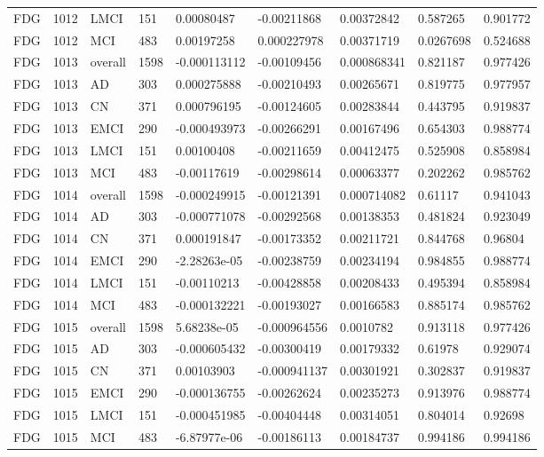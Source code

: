 \begin{landscape}
\begin{longtable}{lllllllll}
FDG & 1012 & LMCI & 151 & 0.00080487 & -0.00211868 & 0.00372842 & 0.587265 & 0.901772 \\
FDG & 1012 & MCI & 483 & 0.00197258 & 0.000227978 & 0.00371719 & 0.0267698 & 0.524688 \\
FDG & 1013 & overall & 1598 & -0.000113112 & -0.00109456 & 0.000868341 & 0.821187 & 0.977426 \\
FDG & 1013 & AD & 303 & 0.000275888 & -0.00210493 & 0.00265671 & 0.819775 & 0.977957 \\
FDG & 1013 & CN & 371 & 0.000796195 & -0.00124605 & 0.00283844 & 0.443795 & 0.919837 \\
FDG & 1013 & EMCI & 290 & -0.000493973 & -0.00266291 & 0.00167496 & 0.654303 & 0.988774 \\
FDG & 1013 & LMCI & 151 & 0.00100408 & -0.00211659 & 0.00412475 & 0.525908 & 0.858984 \\
FDG & 1013 & MCI & 483 & -0.00117619 & -0.00298614 & 0.00063377 & 0.202262 & 0.985762 \\
FDG & 1014 & overall & 1598 & -0.000249915 & -0.00121391 & 0.000714082 & 0.61117 & 0.941043 \\
FDG & 1014 & AD & 303 & -0.000771078 & -0.00292568 & 0.00138353 & 0.481824 & 0.923049 \\
FDG & 1014 & CN & 371 & 0.000191847 & -0.00173352 & 0.00211721 & 0.844768 & 0.96804 \\
FDG & 1014 & EMCI & 290 & -2.28263e-05 & -0.00238759 & 0.00234194 & 0.984855 & 0.988774 \\
FDG & 1014 & LMCI & 151 & -0.00110213 & -0.00428858 & 0.00208433 & 0.495394 & 0.858984 \\
FDG & 1014 & MCI & 483 & -0.000132221 & -0.00193027 & 0.00166583 & 0.885174 & 0.985762 \\
FDG & 1015 & overall & 1598 & 5.68238e-05 & -0.000964556 & 0.0010782 & 0.913118 & 0.977426 \\
FDG & 1015 & AD & 303 & -0.000605432 & -0.00300419 & 0.00179332 & 0.61978 & 0.929074 \\
FDG & 1015 & CN & 371 & 0.00103903 & -0.000941137 & 0.00301921 & 0.302837 & 0.919837 \\
FDG & 1015 & EMCI & 290 & -0.000136755 & -0.00262624 & 0.00235273 & 0.913976 & 0.988774 \\
FDG & 1015 & LMCI & 151 & -0.000451985 & -0.00404448 & 0.00314051 & 0.804014 & 0.92698 \\
FDG & 1015 & MCI & 483 & -6.87977e-06 & -0.00186113 & 0.00184737 & 0.994186 & 0.994186 \\

\end{longtable}
\end{landscape}

